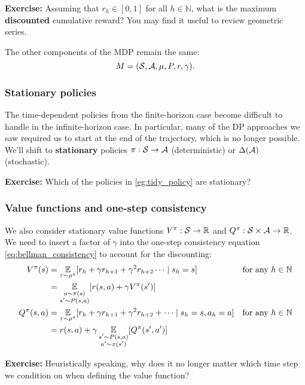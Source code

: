 \documentclass[\main/main]{subfiles}
\begin{document}
\textbf{Exercise:} Assuming that $r_h \in [0, 1]$ for all $h \in \mathbb{N}$, what is the maximum \textbf{discounted} cumulative reward? You may find it useful to review geometric series.

The other components of the MDP remain the same:
\[ M = (\mathcal{S}, \mathcal{A}, \mu, P, r, \gamma). \]

\subsubsection{Stationary policies}

The time-dependent policies from the finite-horizon case become difficult to handle in the infinite-horizon case. In particular, many of the DP approaches we saw required us to start at the end of the trajectory, which is no longer possible. We'll shift to \textbf{stationary} policies $\pi : \mathcal{S} \to \mathcal{A}$ (deterministic) or $\Delta(\mathcal{A})$ (stochastic).

\textbf{Exercise:} Which of the policies in \ref{eg:tidy_policy} are stationary?

\subsubsection{Value functions and one-step consistency}

We also consider stationary value functions $V^\pi : \mathcal{S} \to \mathbb{R}$ and $Q^\pi : \mathcal{S} \times \mathcal{A} \to \mathbb{R}$. We need to insert a factor of $\gamma$ into the one-step consistency equation \eqref{eq:bellman_consistency} to account for the discounting:
\begin{equation}
\begin{aligned}
    V^\pi(s) &= \operatorname*{\mathbb{E}}_{\tau \sim \rho^\pi} [r_h + \gamma r_{h+1} + \gamma^2 r_{h+2} \cdots \mid s_h = s] && \text{for any } h \in \mathbb{N} \\
    &= \operatorname*{\mathbb{E}}_{\substack{a \sim \pi(s) \\ s' \sim P(s, a)}} [r(s, a) + \gamma V^\pi(s')]\\
    Q^\pi(s, a) &= \operatorname*{\mathbb{E}}_{\tau \sim \rho^\pi} [r_h + \gamma r_{h+1} + \gamma^2 r_{h+2} + \cdots \mid s_h = s, a_h = a] && \text{for any } h \in \mathbb{N} \\
    &= r(s, a) + \gamma \operatorname*{\mathbb{E}}_{\substack{s' \sim P(s, a) \\ a' \sim \pi(s')}} [Q^\pi(s', a')]
\end{aligned}
\label{eq:bellman_consistency_infinite}
\end{equation}

\textbf{Exercise:} Heuristically speaking, why does it no longer matter which time step we condition on when defining the value function?
\end{document}

